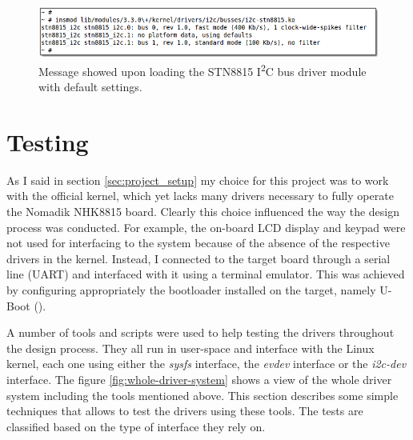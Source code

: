 \documentclass[a4paper,10pt]{article}
\newcommand{\iic}{I\textsuperscript{2}C }
\begin{document}
\begin{multicols}{2}
\begin{figure}
 \includegraphics[width=12.4cm, height=1.7cm]{./figures/dump-adapter-insmod.png}
 \caption{Message showed upon loading the STN8815 \iic bus driver module with
 	default settings.}
 \label{fig:i2c-adapter-insmod}
\end{figure}


\section{Testing}
\label{sec:testing}

As I said in section \ref{sec:project_setup} my choice for this project was
to work with the official kernel, which yet lacks many drivers necessary to
fully operate the Nomadik NHK8815 board. Clearly this choice influenced the
way the design process was conducted.
For example, the on-board LCD display and keypad were not used for interfacing
to the system because of the absence of the respective drivers in the kernel.
Instead, I connected to the target board through a serial line (UART) and
interfaced with it using a terminal emulator. This was achieved by configuring
appropriately the bootloader installed on the target, namely U-Boot
(\cite{uboot}).

A number of tools and scripts were used to help testing the drivers throughout
the design process. They all run in user-space and interface with the Linux
kernel, each one using either the \emph{sysfs} interface, the \emph{evdev}
interface or the \emph{i2c-dev} interface.
The figure \ref{fig:whole-driver-system} shows a view of the whole driver
system including the tools mentioned above.
This section describes some simple techniques that allows to test the drivers
using these tools. The tests are classified based on the type of interface 
they rely on.


\end{multicols}
\end{document}
